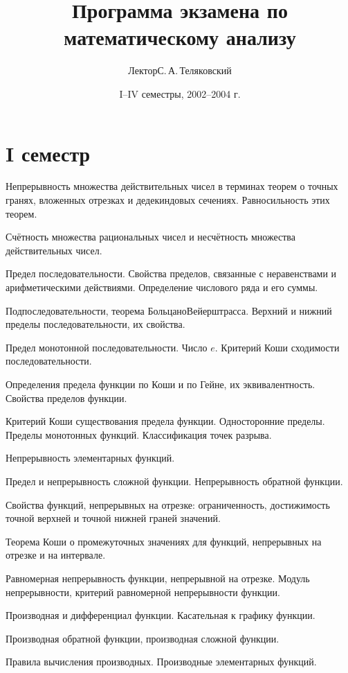 \documentclass[a4paper]{article}
\title{Программа экзамена по математическому анализу}
\author{Лектор\т С.\,А.\,Теляковский}
\date{I--IV семестры, 2002--2004 г.}
\begin{document}
\maketitle

\section*{I семестр}
\begin{nums}{-3}
\item Непрерывность множества действительных чисел в терминах теорем
      о точных гранях, вложенных отрезках и дедекиндовых сечениях. Равносильность
      этих теорем.
\item Счётность множества рациональных чисел и несчётность множества действительных чисел.
\item Предел последовательности. Свойства пределов, связанные с неравенствами
      и арифметическими действиями. Определение числового ряда и его суммы.
\item Подпоследовательности, теорема Больцано\ч Вейерштрасса. Верхний и нижний пределы последовательности,
их свойства.
\item Предел монотонной последовательности. Число $e$. Критерий Коши сходимости последовательности.
\item Определения предела функции по Коши и по Гейне, их эквивалентность. Свойства пределов функции.
\item Критерий Коши существования предела функции. Односторонние пределы. Пределы монотонных функций.
 Классификация точек разрыва.
\item Непрерывность элементарных функций.
\item Предел и непрерывность сложной функции. Непрерывность обратной функции.
\item Свойства функций, непрерывных на отрезке: ограниченность, достижимость точной верхней и точной
нижней граней значений.
\item Теорема Коши о промежуточных значениях для функций, непрерывных на отрезке и на интервале.
\item Равномерная непрерывность функции, непрерывной на отрезке. Модуль непрерывности, критерий равномерной
непрерывности функции.
\item Производная и дифференциал функции. Касательная к графику функции.
\item Производная обратной функции, производная сложной функции.
\item Правила вычисления производных. Производные элементарных функций.

\end{nums}
\end{document}
